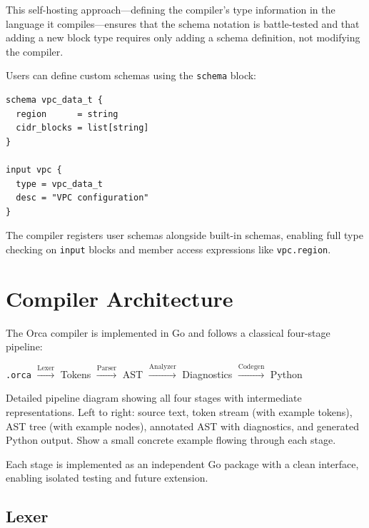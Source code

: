 \documentclass[sigconf,nonacm]{acmart}
\begin{document}
This self-hosting approach---defining the compiler's type information in
the language it compiles---ensures that the schema notation is
battle-tested and that adding a new block type requires only adding a
schema definition, not modifying the compiler.

Users can define custom schemas using the \texttt{schema} block:

\begin{lstlisting}
schema vpc_data_t {
  region      = string
  cidr_blocks = list[string]
}

input vpc {
  type = vpc_data_t
  desc = "VPC configuration"
}
\end{lstlisting}

The compiler registers user schemas alongside built-in schemas, enabling
full type checking on \texttt{input} blocks and member access expressions
like \texttt{vpc.region}.

\section{Compiler Architecture}
\label{sec:compiler}

The Orca compiler is implemented in Go and follows a classical four-stage
pipeline:

\begin{center}
\texttt{.orca} $\xrightarrow{\text{Lexer}}$ Tokens
$\xrightarrow{\text{Parser}}$ AST
$\xrightarrow{\text{Analyzer}}$ Diagnostics
$\xrightarrow{\text{Codegen}}$ Python
\end{center}

\begin{imgplaceholder}
Detailed pipeline diagram showing all four stages with intermediate
representations. Left to right: source text, token stream (with example
tokens), AST tree (with example nodes), annotated AST with diagnostics,
and generated Python output. Show a small concrete example flowing through
each stage.
\end{imgplaceholder}

Each stage is implemented as an independent Go package with a clean
interface, enabling isolated testing and future extension.

\subsection{Lexer}
\label{sec:compiler:lexer}
\end{document}
